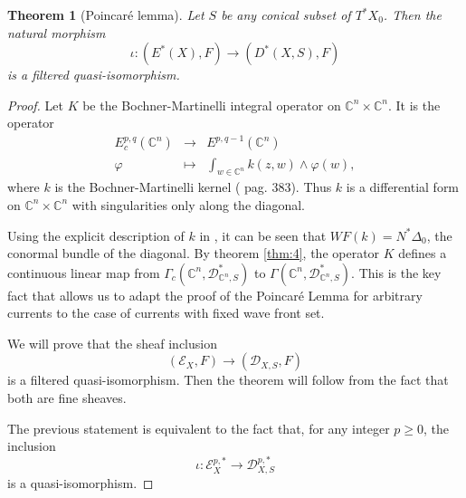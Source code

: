 \documentclass[10pt,twoside]{article}
\numberwithin{equation}{section}
\theoremstyle{plain}
\newtheorem{theorem}[equation]{Theorem}
\theoremstyle{definition}
\begin{document}
\begin{theorem}[Poincar\'e lemma]\label{thm:2} Let $S$ be any conical
  subset of $T^{\ast}X_{0}$. Then the natural morphism 
  \begin{displaymath}
    \iota\colon (E^{\ast}(X), F)\longrightarrow
    (D^{\ast}(X,S), F) 
  \end{displaymath}
  is a filtered quasi-isomorphism.
\end{theorem}
\begin{proof}
  Let $K$ be the Bochner-Martinelli integral operator on $\mathbb{C}^{n}\times
  \mathbb{C}^{n}$. 
  It is the operator
  \begin{displaymath}
    \begin{matrix}
      E_{c}^{p,q}(\mathbb{C}^{n})&\longrightarrow &
      E^{p,q-1}(\mathbb{C}^{n})\\
       \varphi&\longmapsto & \int_{w\in \mathbb{C}^{n}}k(z,w)\land \varphi(w),
    \end{matrix}
  \end{displaymath}
  where $k$ is the Bochner-Martinelli kernel
  (\cite{GriffithsHarris:pag} pag. 383). Thus $k$ is a differential
  form on $\mathbb{C}^{n}\times 
  \mathbb{C}^{n}$ with singularities only along the diagonal.

  Using the explicit description of $k$ in
  \cite{GriffithsHarris:pag}, it can be seen that
  $WF(k)=N^{\ast}\Delta _{0}$, the conormal bundle of the diagonal. By
  theorem \ref{thm:4}, 
  the operator $K$ defines a continuous linear map
  from $\Gamma _{c}(\mathbb{C}^{n},\mathscr{D}^{\ast}_{\mathbb{C}^{n},S})$ to 
  $\Gamma
  (\mathbb{C}^{n},\mathscr{D}^{\ast}_{\mathbb{C}^{n},S})$. This is the
  key fact that allows us to adapt the proof of the Poincar\'e Lemma
  for arbitrary currents to the case of currents with fixed wave front
  set.   

  We will prove that the sheaf inclusion
  \begin{displaymath}
    (\mathscr{E}_{X},F)\longrightarrow (\mathscr{D}_{X,S},F)
  \end{displaymath}
  is a filtered quasi-isomorphism. Then the theorem will follow from
  the fact that both are fine sheaves.
  
  The previous statement is equivalent to the fact that, for any
  integer $p\ge 0$, the inclusion 
  \begin{displaymath}
    \iota\colon \mathscr{E}^{p,*}_{X}\longrightarrow \mathscr{D}^{p,*}_{X,S}
  \end{displaymath}
  is a quasi-isomorphism.


\end{proof}
\end{document}
